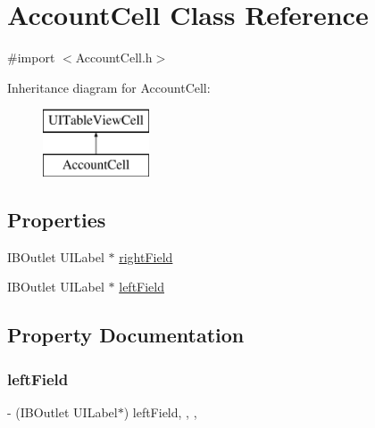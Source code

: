 \hypertarget{interface_account_cell}{}\section{Account\+Cell Class Reference}
\label{interface_account_cell}


{\ttfamily \#import $<$Account\+Cell.\+h$>$}

Inheritance diagram for Account\+Cell\+:\begin{figure}[H]
\begin{center}
\leavevmode
\includegraphics[height=2.000000cm]{interface_account_cell}
\end{center}
\end{figure}
\subsection*{Properties}
\begin{DoxyCompactItemize}
\item 
I\+B\+Outlet U\+I\+Label $\ast$ \hyperlink{interface_account_cell_a9c27b0dbe68965b4d3460ddc0ed8ffa1}{right\+Field}
\item 
I\+B\+Outlet U\+I\+Label $\ast$ \hyperlink{interface_account_cell_a14ebc5200fdc569c389c0167c7e58f04}{left\+Field}
\end{DoxyCompactItemize}


\subsection{Property Documentation}
\hypertarget{interface_account_cell_a14ebc5200fdc569c389c0167c7e58f04}{}\label{interface_account_cell_a14ebc5200fdc569c389c0167c7e58f04} 
\subsubsection{\texorpdfstring{left\+Field}{leftField}}
{\footnotesize\ttfamily -\/ (I\+B\+Outlet U\+I\+Label$\ast$) left\+Field\hspace{0.3cm}{\ttfamily [read]}, {\ttfamily [write]}, {\ttfamily [nonatomic]}, {\ttfamily [weak]}}

